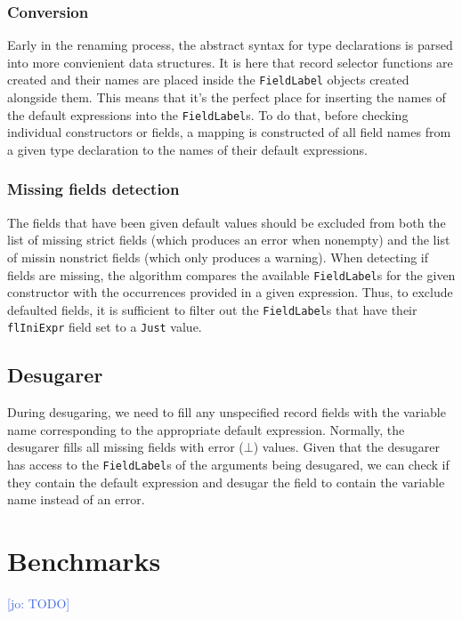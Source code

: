\documentclass[en]{pracamgr}
\newcommand{\jcom}[1]{\textcolor{RoyalBlue}{[jo: #1]}}
\begin{document}
\subsection{Conversion}
Early in the renaming process, the abstract syntax for type declarations is parsed into more convienient data structures.
It is here that record selector functions are created and their names are placed inside the \texttt{FieldLabel} objects created alongside them.
This means that it's the perfect place for inserting the names of the default expressions into the \texttt{FieldLabel}s.
To do that, before checking individual constructors or fields, a mapping is constructed of all field names from a given type declaration to the names of their default expressions.
\subsection{Missing fields detection}
The fields that have been given default values should be excluded from both the list of missing strict fields (which produces an error when nonempty) and the list of missin nonstrict fields (which only produces a warning).
When detecting if fields are missing, the algorithm compares the available \texttt{FieldLabel}s for the given constructor with the occurrences provided in a given expression.
Thus, to exclude defaulted fields, it is sufficient to filter out the \texttt{FieldLabel}s that have their \texttt{flIniExpr} field set to a \texttt{Just} value.

\section{Desugarer}
During desugaring, we need to fill any unspecified record fields with the variable name corresponding to the appropriate default expression.
Normally, the desugarer fills all missing fields with error ($\bot$) values.
Given that the desugarer has access to the \texttt{FieldLabel}s of the arguments being desugared, we can check if they contain the default expression and desugar the field to contain the variable name instead of an error.


\chapter{Benchmarks}
\jcom{TODO}
\end{document}
